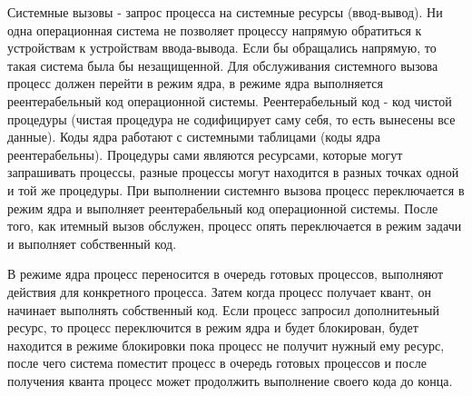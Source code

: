 \documentclass[a4paper, 14pt]{report}
\begin{document}
Системные вызовы - запрос процесса на системные ресурсы (ввод-вывод). Ни одна операционная система не позволяет процессу напрямую обратиться к устройствам к устройствам ввода-вывода. Если бы обращались напрямую, то такая система была бы незащищенной. Для обслуживания системного вызова процесс должен перейти в режим ядра, в режиме ядра выполняется реентерабельный код операционной системы. Реентерабельный код - код чистой процедуры (чистая процедура не содифицирует саму себя, то есть вынесены все данные). Коды ядра работают с системными таблицами (коды ядра реентерабельны). Процедуры сами являются ресурсами, которые могут запрашивать процессы, разные процессы могут находится в разных точках одной и той же процедуры. При выполнении системнго вызова процесс переключается в режим ядра и выполняет реентерабельный код операционной системы. После того, как итемный вызов обслужен, процесс опять переключается в режим задачи и выполняет собственный код.

В режиме ядра процесс переносится в очередь готовых процессов, выполняют действия для конкретного процесса. Затем когда процесс получает квант, он начинает выполнять собственный код. Если процесс запросил дополнитеьный ресурс, то процесс переключится в режим ядра и будет блокирован, будет находится в режиме блокировки пока процесс не получит нужный ему ресурс, после чего система поместит процесс в очередь готовых процессов и после получения кванта процесс может продолжить выполнение своего кода до конца.
\end{document}
